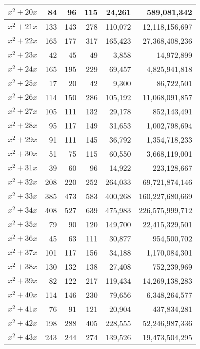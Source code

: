 \documentclass[a4paper]{amsproc}
\theoremstyle{plain}
\theoremstyle{named}
\begin{document}
\begin{longtable}{ | l | r | r | r | r | r | }
$x^2 + 20x$ & 84 & 96 & 115 & 24{,}261 & 589{,}081{,}342 \\ \hline
$x^2 + 21x$ & 133 & 143 & 278 & 110{,}072 & 12{,}118{,}156{,}697 \\ \hline
$x^2 + 22x$ & 165 & 177 & 317 & 165{,}423 & 27{,}368{,}408{,}236 \\ \hline
$x^2 + 23x$ & 42 & 45 & 49 & 3{,}858 & 14{,}972{,}899 \\ \hline
$x^2 + 24x$ & 165 & 195 & 229 & 69{,}457 & 4{,}825{,}941{,}818 \\ \hline
$x^2 + 25x$ & 17 & 20 & 42 & 9{,}300 & 86{,}722{,}501 \\ \hline
$x^2 + 26x$ & 114 & 150 & 286 & 105{,}192 & 11{,}068{,}091{,}857 \\ \hline
$x^2 + 27x$ & 105 & 111 & 132 & 29{,}178 & 852{,}143{,}491 \\ \hline
$x^2 + 28x$ & 95 & 117 & 149 & 31{,}653 & 1{,}002{,}798{,}694 \\ \hline
$x^2 + 29x$ & 91 & 111 & 145 & 36{,}792 & 1{,}354{,}718{,}233 \\ \hline
$x^2 + 30x$ & 51 & 75 & 115 & 60{,}550 & 3{,}668{,}119{,}001 \\ \hline
$x^2 + 31x$ & 39 & 60 & 96 & 14{,}922 & 223{,}128{,}667 \\ \hline
$x^2 + 32x$ & 208 & 220 & 252 & 264{,}033 & 69{,}721{,}874{,}146 \\ \hline
$x^2 + 33x$ & 385 & 473 & 583 & 400{,}268 & 160{,}227{,}680{,}669 \\ \hline
$x^2 + 34x$ & 408 & 527 & 639 & 475{,}983 & 226{,}575{,}999{,}712 \\ \hline
$x^2 + 35x$ & 79 & 90 & 120 & 149{,}700 & 22{,}415{,}329{,}501 \\ \hline
$x^2 + 36x$ & 45 & 63 & 111 & 30{,}877 & 954{,}500{,}702 \\ \hline
$x^2 + 37x$ & 101 & 117 & 156 & 34{,}188 & 1{,}170{,}084{,}301 \\ \hline
$x^2 + 38x$ & 130 & 132 & 138 & 27{,}408 & 752{,}239{,}969 \\ \hline
$x^2 + 39x$ & 82 & 122 & 217 & 119{,}434 & 14{,}269{,}138{,}283 \\ \hline
$x^2 + 40x$ & 114 & 146 & 230 & 79{,}656 & 6{,}348{,}264{,}577 \\ \hline
$x^2 + 41x$ & 76 & 91 & 121 & 20{,}904 & 437{,}834{,}281 \\ \hline
$x^2 + 42x$ & 198 & 288 & 405 & 228{,}555 & 52{,}246{,}987{,}336 \\ \hline
$x^2 + 43x$ & 243 & 244 & 274 & 139{,}526 & 19{,}473{,}504{,}295 \\ \hline

\end{longtable}
\end{document}
